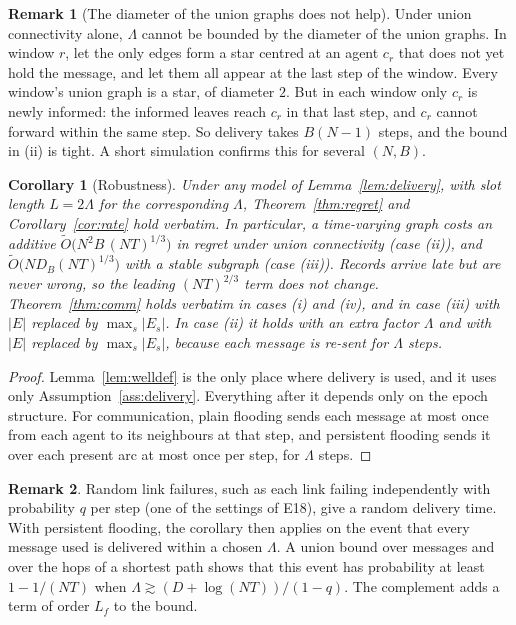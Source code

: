 \documentclass[11pt]{article}
\newtheorem{corollary}[theorem]{Corollary}
\theoremstyle{definition}
\newtheorem{remark}{Remark}
\begin{document}
\begin{remark}[The diameter of the union graphs does not help]\label{rem:star}
Under union connectivity alone, $\Lambda$ cannot be bounded by the diameter of the union graphs. In window $r$, let
the only edges form a star centred at an agent $c_r$ that does not yet hold the message, and let them all appear at the
last step of the window. Every window's union graph is a star, of diameter $2$. But in each window only $c_r$ is newly
informed: the informed leaves reach $c_r$ in that last step, and $c_r$ cannot forward within the same step. So
delivery takes $B(N-1)$ steps, and the bound in (ii) is tight. A short simulation confirms this for several $(N,B)$.
\end{remark}

\begin{corollary}[Robustness]\label{cor:robust}
Under any model of Lemma~\ref{lem:delivery}, with slot length $L=2\Lambda$ for the corresponding $\Lambda$,
Theorem~\ref{thm:regret} and Corollary~\ref{cor:rate} hold verbatim. In particular, a time-varying graph costs an
additive $\tilde O\big(N^2B\,(NT)^{1/3}\big)$ in regret under union connectivity (case (ii)), and
$\tilde O\big(N D_B(NT)^{1/3}\big)$ with a stable subgraph (case (iii)). Records arrive late but are never wrong, so the
leading $(NT)^{2/3}$ term does not change. Theorem~\ref{thm:comm} holds verbatim in cases (i) and (iv), and in case
(iii) with $|E|$ replaced by $\max_s|E_s|$. In case (ii) it holds with an extra factor $\Lambda$ and with $|E|$
replaced by $\max_s|E_s|$, because each message is re-sent for $\Lambda$ steps.
\end{corollary}
\begin{proof}
Lemma~\ref{lem:welldef} is the only place where delivery is used, and it uses only Assumption~\ref{ass:delivery}.
Everything after it depends only on the epoch structure. For communication, plain flooding sends each message at most
once from each agent to its neighbours at that step, and persistent flooding sends it over each present arc at most
once per step, for $\Lambda$ steps.
\end{proof}

\begin{remark}
Random link failures, such as each link failing independently with probability $q$ per step (one of the settings
of E18), give a random delivery time. With persistent flooding, the corollary then applies on the event that every
message used is delivered within a chosen $\Lambda$. A union bound over messages and over the hops of a shortest path
shows that this event has probability at least $1-1/(NT)$ when $\Lambda\gtrsim(D+\log(NT))/(1-q)$. The complement adds
a term of order $L_f$ to the bound.
\end{remark}
\end{document}
